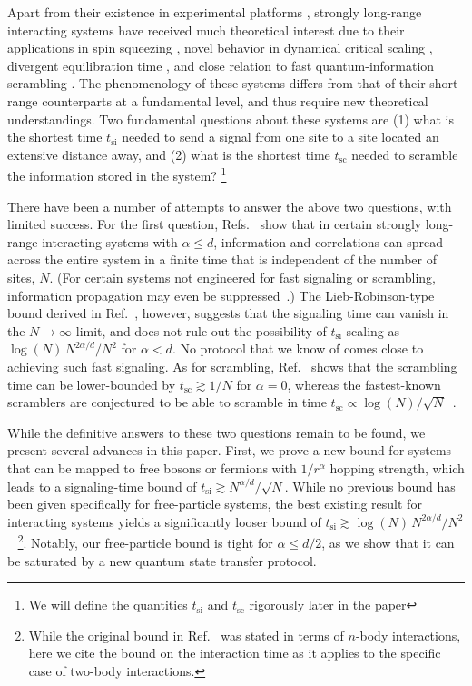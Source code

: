 Apart from their existence in experimental platforms \cite{Monroe13, Britton2012, Blatt12,Yan2013,Lukin17}, strongly long-range interacting systems have received much theoretical interest due to their applications in spin squeezing \cite{FossFeig16}, novel behavior in dynamical critical scaling \cite{Defenu18,Acevedo14}, divergent equilibration time \cite{Kastner11}, and close relation to fast quantum-information scrambling \cite{SY93,Bollinger17, Kitaev15, Maldacena16, SS08,Lucas18,Lucas19}. The phenomenology of these systems differs from that of their short-range counterparts at a fundamental level, and thus require new theoretical understandings.
Two fundamental questions about these systems are (1) what is the shortest time $t_{\text{si}}$ needed to send a signal from one site to a site located an extensive distance away, and (2) what is the shortest time $t_{\text{sc}}$ needed to scramble the information stored in the system? \footnote{We will define the quantities $t_{\text{si}}$ and $t_{\text{sc}}$ rigorously later in the paper}

There have been a number of attempts to answer the above two questions, with limited success.
For the first question, Refs.~\cite{Eisert13,Hauke13,Eldredge2017} show that in certain strongly long-range interacting systems with $\alpha\le d$, information and correlations can spread across the entire system in a finite time that is independent of the number of sites, $N$.
(For certain systems not engineered for fast signaling or scrambling, information propagation may even be suppressed~\cite{Santos16}.)
The Lieb-Robinson-type bound derived in Ref.~\cite{Storch15}, however, suggests that the signaling time can vanish in the $N\rightarrow\infty$ limit, and does not rule out the possibility of $t_\text{si}$ scaling as $\log(N)\,N^{2\alpha/d}/N^2$ for $\alpha < d$.
No protocol that we know of comes close to achieving such fast signaling.
As for scrambling, Ref.~\cite{Lashkari2013} shows that the scrambling time can be lower-bounded by  $t_\text{sc} \gtrsim 1/N$ for $\alpha=0$, whereas the fastest-known scramblers are conjectured to be able to scramble in time $t_\text{sc} \propto \log(N)/\sqrt{N}$\ \cite{SS08}.

While the definitive answers to these two questions remain to be found, we present several advances in this paper.
First, we prove a new bound for systems that can be mapped to free bosons or fermions with $1/r^{\alpha}$ hopping strength, which leads to a signaling-time bound of $t_\text{si} \gtrsim N^{\alpha/d}/\sqrt{N}$.
While no previous bound has been given specifically for free-particle systems, the best existing result for interacting systems yields a significantly looser bound of $t_\text{si} \gtrsim \log(N)\,N^{2\alpha/d}/N^2$~\cite{Storch15}
\footnote{While the original bound in Ref.~\cite{Storch15} was stated in terms of $n$-body interactions, here we cite the bound on the interaction time as it applies to the specific case of two-body interactions.}.
Notably, our free-particle bound is tight for $\alpha\le d/2$, as we show that it can be saturated by a new quantum state transfer protocol.

